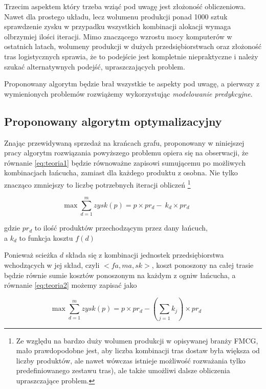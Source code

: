 \documentclass[polish, twoside, 12pt, a4paper]{article}
\theoremstyle{definition}
\theoremstyle{plain}
\theoremstyle{remark}
\begin{document}
Trzecim aspektem który trzeba wziąć pod uwagę jest złożoność obliczeniowa. Nawet dla prostego układu, lecz wolumenu produkcji ponad 1000 sztuk sprawdzenie zysku w przypadku wszystkich kombinacji alokacji wymaga olbrzymiej ilości iteracji. Mimo znaczącego wzrostu mocy komputerów w ostatnich latach, wolumeny produkcji w dużych przedsiębiorstwach oraz złożoność tras logistycznych sprawia, że to podejście jest kompletnie niepraktyczne i należy szukać alternatywnych podejść, upraszczających problem.

 Proponowany algorytm będzie brał wszystkie te aspekty pod uwagę, a pierwszy z wymienionych problemów rozwiążemy wykorzystując  \textit{modelowanie predykcyjne}.

\subsection{Proponowany algorytm optymalizacyjny} 
Znając przewidywaną sprzedaż na krańcach grafu, proponowany w niniejszej pracy algorytm rozwiązania powyższego problemu opiera się na obserwacji, że równanie \ref{eq:teoria1} będzie równoważne zapisowi sumującemu po możliwych kombinacjach łańcucha, zamiast dla każdego produktu z osobna. Nie tylko znacząco zmniejszy to liczbę potrzebnych iteracji obliczeń \footnote{Ze względu na bardzo duży wolumen produkcji w opisywanej branży FMCG, mało prawdopodobne jest, aby liczba kombinacji tras dostaw była większa od liczby produktów, ale nawet wówczas istnieje możliwość rozważania tylko predefiniowanego zestawu tras), ale także umożliwi dalsze obliczenia upraszczające problem.}

\begin{equation}  \label{eq:teoria2}
\max \sum\limits_{d=1}^m  zysk(p) = 
p \times pr_d -  \ k_d \times pr_d \qquad 
\end{equation}

\begin{center}
  gdzie $pr_d$ to ilość produktów przechodzącym przez dany łańcuch, \\ 
  a $k_d$ to funkcja kosztu $f(d)$
\end{center}

Ponieważ scieżka $d$ składa się z kombinacji jednostek przedsiębiorstwa wchodzących w jej skład, czyli $<fa,ma,sk>$, koszt ponoszony na całej trasie będzie równie sumie kosztów ponoszonym na każdym z ogniw łańcucha, a równanie \ref{eq:teoria2} możemy zapisać jako

\begin{equation} \label{eq:teoria3}
\max \sum\limits_{d=1}^m  zysk(p) = 
p \times pr_d -  ( \sum\limits_{j=1} k_j) \times pr_d \qquad 
\end{equation}
\end{document}
